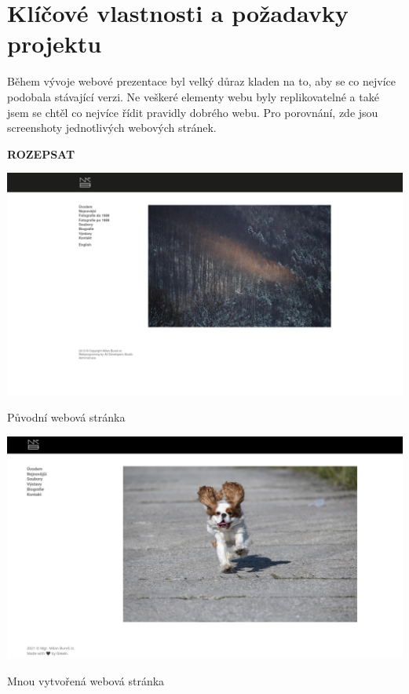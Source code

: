 \documentclass[12pt,a4paper]{report}
\begin{document}
  \chapter{Klíčové vlastnosti a požadavky projektu}
  Během vývoje webové prezentace byl velký důraz kladen na to, aby se co nejvíce podobala
  stávající verzi. Ne veškeré elementy webu byly replikovatelné a také jsem se chtěl co nejvíce řídit
  pravidly dobrého webu. Pro porovnání, zde jsou screenshoty jednotlivých webových stránek.

  \textbf{ROZEPSAT}

  \vspace*{0.5cm}
  \noindent\includegraphics[width=\linewidth]{milanburescz.png}
  \begin{center}
    Původní webová stránka
  \end{center}
  \vspace*{0.5cm}
  \noindent\includegraphics[width=\linewidth]{dmp-bures.png}
  \begin{center}
    Mnou vytvořená webová stránka
  \end{center}
  \vspace*{0.5cm}
\end{document}
